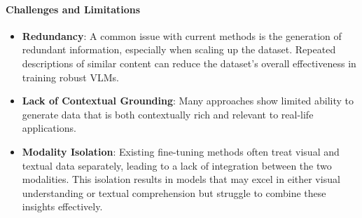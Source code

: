 \begin{enumerate}
    
\end{enumerate}

\paragraph{\textbf{Challenges and Limitations}}

\begin{itemize}
    \item \textbf{Redundancy}: A common issue with current methods is the generation of redundant information, especially when scaling up the dataset. Repeated descriptions of similar content can reduce the dataset's overall effectiveness in training robust VLMs.
    \item \textbf{Lack of Contextual Grounding}: Many approaches show limited ability to generate data that is both contextually rich and relevant to real-life applications.
    \item \textbf{Modality Isolation}: Existing fine-tuning methods often treat visual and textual data separately, leading to a lack of integration between the two modalities. This isolation results in models that may excel in either visual understanding or textual comprehension but struggle to combine these insights effectively.
\end{itemize}


